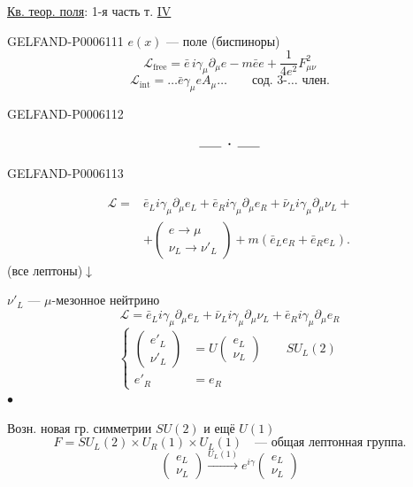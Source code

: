 \underline{Кв. теор. поля}: 1-я часть т. \underline{IV}\quad{}


\begin{GelfandAdjacentEvidence}{GELFAND-P000611}{1}
\(e(x)\) — поле (биспиноры)
\[
\mathcal L_{\mathrm{free}}=\bar e\,i\gamma_\mu\partial_\mu e
-m\bar e e+\frac1{4e^2}F_{\mu\nu}^2
\]
\[
\mathcal L_{\mathrm{int}}=\ldots\bar e\gamma_\mu e A_\mu\ldots
\qquad\text{сод. 3-… член.}
\]
\end{GelfandAdjacentEvidence}
\begin{GelfandAdjacentEvidence}{GELFAND-P000611}{2}

\[\rule{1.8em}{.4pt}\;\boldsymbol{\cdot}\;\rule{1.8em}{.4pt}\]
\end{GelfandAdjacentEvidence}
\begin{GelfandAdjacentEvidence}{GELFAND-P000611}{3}

\[
\begin{aligned}
\mathcal L={}&\bar e_L i\gamma_\mu\partial_\mu e_L
+\bar e_R i\gamma_\mu\partial_\mu e_R
+\bar\nu_L i\gamma_\mu\partial_\mu\nu_L+\\
&+\begin{pmatrix}e\to\mu\\ \nu_L\to\nu'_L\end{pmatrix}
+m(\bar e_L e_R+\bar e_R e_L).
\end{aligned}
\]
(все лептоны)\quad\(\downarrow\)

\(\nu'_L\) — \(\mu\)-мезонное нейтрино
\[
\mathcal L=\bar e_L i\gamma_\mu\partial_\mu e_L
+\bar\nu_L i\gamma_\mu\partial_\mu\nu_L
+\bar e_R i\gamma_\mu\partial_\mu e_R
\]
\[
\left\{
\begin{aligned}
\begin{pmatrix}e'_L\\\nu'_L\end{pmatrix}
&=U\begin{pmatrix}e_L\\\nu_L\end{pmatrix}
\qquad SU_L(2)\\
e'_R&=e_R
\end{aligned}
\right.
\]
\hfill\(\bullet\)

Возн. новая гр. симметрии \(SU(2)\) и ещё \(U(1)\)
\[
F=SU_L(2)\times U_R(1)\times U_L(1)
\quad\text{— общая лептонная группа.}
\]
\[
\begin{pmatrix}e_L\\\nu_L\end{pmatrix}
\overset{U_L(1)}{\longrightarrow}
e^{i\gamma}\begin{pmatrix}e_L\\\nu_L\end{pmatrix}
\]
\end{GelfandAdjacentEvidence}
